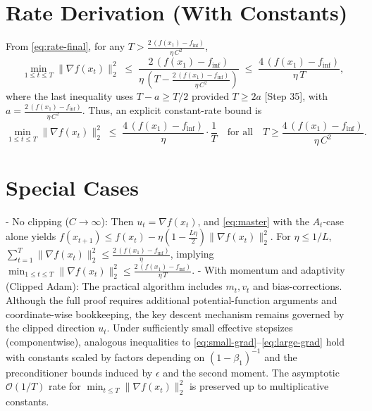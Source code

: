 \documentclass[11pt]{article}
\begin{document}
\section*{Rate Derivation (With Constants)}
From \eqref{eq:rate-final}, for any $T > \frac{2\,(f(x_1)-f_\inf)}{\eta\, C^2}$,
\[
\min_{1\le t\le T} \|\nabla f(x_t)\|_2^2 \;\le\; \frac{2\,(f(x_1)-f_\inf)}{\eta\, \left(T - \frac{2\,(f(x_1)-f_\inf)}{\eta\, C^2}\right)}
\;\le\; \frac{4\,(f(x_1)-f_\inf)}{\eta\, T},
\]
where the last inequality uses $T - a \ge T/2$ provided $T\ge 2a$ [Step 35], with $a=\frac{2\,(f(x_1)-f_\inf)}{\eta\, C^2}$. Thus, an explicit constant-rate bound is
\[
\min_{1\le t\le T} \|\nabla f(x_t)\|_2^2 \;\le\; \frac{4\,(f(x_1)-f_\inf)}{\eta}\cdot \frac{1}{T}
\quad \text{for all}\quad T \ge \frac{4\,(f(x_1)-f_\inf)}{\eta\, C^2}.
\]

\section*{Special Cases}
- No clipping ($C\to\infty$): Then $u_t=\nabla f(x_t)$, and \eqref{eq:master} with the $A_t$-case alone yields
$f(x_{t+1}) \le f(x_t) - \eta(1-\frac{L\eta}{2})\|\nabla f(x_t)\|_2^2$. For $\eta\le 1/L$,
$\sum_{t=1}^T \|\nabla f(x_t)\|_2^2 \le \frac{2\,(f(x_1)-f_\inf)}{\eta}$, implying
$\min_{1\le t\le T}\|\nabla f(x_t)\|_2^2 \le \frac{2\,(f(x_1)-f_\inf)}{\eta\, T}$.
- With momentum and adaptivity (Clipped Adam): The practical algorithm includes $m_t,v_t$ and bias-corrections. Although the full proof requires additional potential-function arguments and coordinate-wise bookkeeping, the key descent mechanism remains governed by the clipped direction $u_t$. Under sufficiently small effective stepsizes (componentwise), analogous inequalities to \eqref{eq:small-grad}--\eqref{eq:large-grad} hold with constants scaled by factors depending on $(1-\beta_1)^{-1}$ and the preconditioner bounds induced by $\epsilon$ and the second moment. The asymptotic $\mathcal{O}(1/T)$ rate for $\min_{t\le T}\|\nabla f(x_t)\|_2^2$ is preserved up to multiplicative constants.
\end{document}
